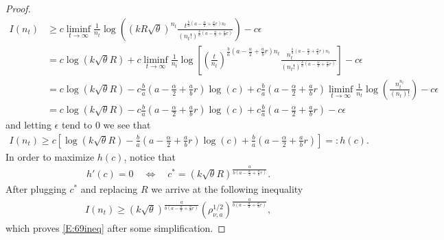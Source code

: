 \documentclass[a4paper,11pt]{article}
\numberwithin{equation}{section}
\numberwithin{equation}{section}
\theoremstyle{plain}
\theoremstyle{definition}
\begin{document}
\begin{proof}
  \begin{align*}
    I(n_t) & \ge c \liminf_{t\to \infty} \frac{1}{n_t} \log \left( (kR\sqrt{\theta})^{n_t} \frac{ t^{\frac{b}{a} \left( a-\frac{\alpha}{2} + \frac{a}{b}r \right)n_t } }{ (n_t!)^{\frac{b}{a}\left( a -\frac{\alpha}{2} + \frac{a}{b}r \right) }  }\right) - c\epsilon                                                                                                  \\
           & = c \log(k \sqrt{\theta}R) + c \liminf_{t \to \infty} \frac{1}{n_t} \log \left[  \left(\frac{t}{n_t}\right)^{\frac{b}{a}\left(a-\frac{\alpha}{2} + \frac{a}{b}r\right)n_t} \frac{ n_t^{\frac{b}{a}\left( a- \frac{\alpha}{2} + \frac{a}{b}r \right)n_t } } { (n_t!)^{\frac{b}{a}\left( a - \frac{\alpha}{2} + \frac{a}{b}r \right) } }\right] - c \epsilon \\
           & = c \log(k \sqrt{\theta}R) - c\frac{b}{a}\left( a - \frac{\alpha}{2} + \frac{a}{b}r \right) \log(c) + c\frac{b}{a}\left( a - \frac{\alpha}{2} + \frac{a}{b}r \right) \liminf_{t \to \infty} \frac{1}{n_t}\log\left(\frac{n_t^{n_t}}{(n_t)!}\right) - c\epsilon                                                                                             \\
           & = c \log(k \sqrt{\theta}R) - c\frac{b}{a}\left( a - \frac{\alpha}{2} + \frac{a}{b}r \right) \log(c) + c\frac{b}{a}\left( a - \frac{\alpha}{2} + \frac{a}{b}r \right)  - c\epsilon
  \end{align*}
  and letting $\epsilon$ tend to $0$ we see that
  \begin{align*}
    I(n_t) \ge c \left[ \log(k \sqrt{\theta}R) - \frac{b}{a}\left( a - \frac{\alpha}{2} + \frac{a}{b}r \right) \log(c) + \frac{b}{a}\left( a - \frac{\alpha}{2} + \frac{a}{b}r \right) \right] =: h(c).
  \end{align*}
  In order to maximize $h(c)$, notice that
  \begin{align*}
    h'(c) = 0 \quad \Longleftrightarrow  \quad  c^*=(k \sqrt{\theta}R)^{\frac{a}{b\left( a - \frac{\alpha}{2} + \frac{a}{b}r \right)}}.
  \end{align*}
  After plugging $c^*$ and replacing $R$ we arrive at the following inequality
  \begin{align*}
    I(n_t) \ge (k\sqrt{\theta})^{\frac{a}{b\left( a - \frac{\alpha}{2} + \frac{a}{b}r \right)} }(\rho_{\nu,a}^{1/2})^{\frac{a}{b\left( a - \frac{\alpha}{2} + \frac{a}{b}r \right)}},
  \end{align*}
  which proves \eqref{E:69ineq} after some simplification.
\end{proof}
\end{document}
